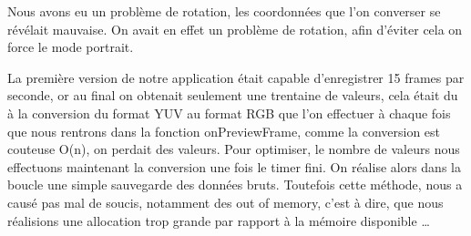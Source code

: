 Nous avons eu un problème de rotation, les coordonnées que l'on converser se révélait mauvaise. On avait en effet un problème de rotation, afin d'éviter cela on force le mode portrait.

La première version de notre application était capable d'enregistrer 15 frames par seconde, or au final on obtenait seulement une trentaine de valeurs, cela était du à la conversion du format YUV au format RGB que l'on 
effectuer à chaque fois que nous rentrons dans la fonction onPreviewFrame, comme la conversion est couteuse O(n), on perdait des valeurs. Pour optimiser, le nombre de valeurs nous effectuons maintenant la conversion
une fois le timer fini. On réalise alors dans la boucle une simple sauvegarde des données bruts. 
Toutefois cette méthode, nous a causé pas mal de soucis, notamment des out of memory, c'est à dire, que nous réalisions une allocation trop grande par rapport à la mémoire disponible \ldots{}


